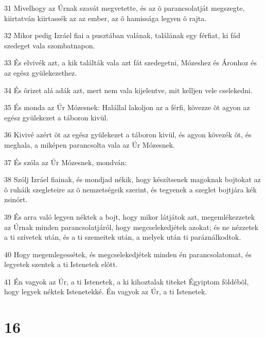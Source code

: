 \par 31 Mivelhogy az Úrnak szavát megvetette, és az õ parancsolatját megszegte, kiirtatván kiirtassék az az ember, az õ hamissága legyen õ rajta.
\par 32 Mikor pedig Izráel fiai a pusztában valának, találának egy férfiat, ki fád szedeget vala szombatnapon.
\par 33 És elvivék azt, a kik találták vala azt fát szedegetni, Mózeshez és Áronhoz és az egész gyülekezethez.
\par 34 És õrizet alá adák azt, mert nem vala kijelentve, mit kelljen vele cselekedni.
\par 35 És monda az Úr Mózesnek: Halállal lakoljon az a férfi, kövezze õt agyon az egész gyülekezet a táboron kivül.
\par 36 Kivivé azért õt az egész gyülekezet a táboron kivül, és agyon kövezék õt, és meghala, a miképen parancsolta vala az Úr Mózesnek.
\par 37 És szóla az Úr Mózesnek, mondván:
\par 38 Szólj Izráel fiainak, és mondjad nékik, hogy készítsenek magoknak bojtokat az õ ruháik szegleteire az õ nemzetségeik szerint, és tegyenek a szeglet bojtjára kék zsinórt.
\par 39 És arra való legyen néktek a bojt, hogy mikor látjátok azt, megemlékezzetek az Úrnak minden parancsolatjáról, hogy megcselekedjétek azokat; és ne nézzetek a ti szívetek után, és a ti szemeitek után, a melyek után ti paráználkodtok.
\par 40 Hogy megemlegessétek, és megcselekedjétek minden én parancsolatomat, és legyetek szentek a ti Istenetek elõtt.
\par 41 Én vagyok az Úr, a ti Istenetek, a ki kihoztalak titeket Égyiptom földébõl, hogy legyek néktek Istenetekké. Én vagyok az Úr, a ti Istenetek.

\chapter{16}

